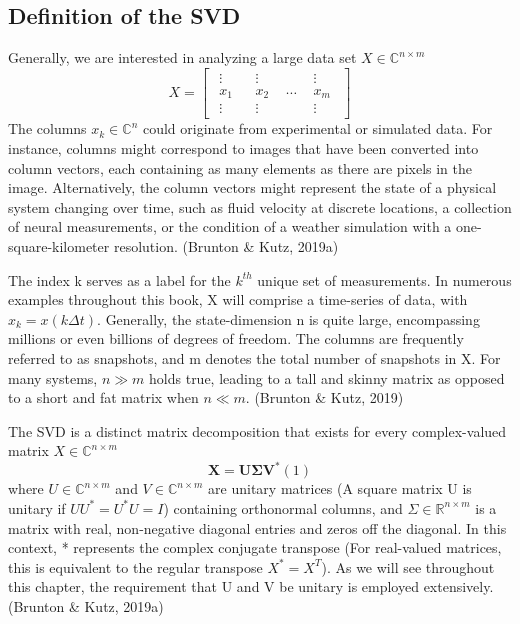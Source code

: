 \documentclass[a4paper]{article}
\begin{document}
{		\subsection{Definition of the SVD}
		Generally, we are interested in analyzing a large data set $X \in \mathbb{C}^{n \times m}$
		\[
		X =
		\begin{bmatrix}
			\begin{array}{c}
				\vdots \\
				x_1 \\
				\vdots
			\end{array}
			&
			\begin{array}{c}
				\vdots \\
				x_2 \\
				\vdots
			\end{array}
			&
			\cdots
			&
			\begin{array}{c}
				\vdots \\
				x_m \\
				\vdots
			\end{array}
		\end{bmatrix}
		\]
		The columns $x_k \in \mathbb{C}^n$ could originate from experimental or simulated data. For instance, columns might correspond to images that have been converted into column vectors, each containing as many elements as there are pixels in the image. Alternatively, the column vectors might represent the state of a physical system changing over time, such as fluid velocity at discrete locations, a collection of neural measurements, or the condition of a weather simulation with a one-square-kilometer resolution. (Brunton \& Kutz, 2019a)
		
		
		The index k serves as a label for the $k^{th}$ unique set of measurements. In numerous examples throughout this book, X will comprise a time-series of data, with $x_k = x(k\Delta t)$. Generally, the state-dimension n is quite large, encompassing millions or even billions of degrees of freedom. The columns are frequently referred to as snapshots, and m denotes the total number of snapshots in X. For many systems, $n \gg m$ holds true, leading to a tall and skinny matrix as opposed to a short and fat matrix when $n \ll m$. (Brunton \& Kutz, 2019)
		
		
		The SVD is a distinct matrix decomposition that exists for every complex-valued matrix $X \in \mathbb{C}^{n \times m}$
		\[
		\textbf{X} = \textbf{U} \boldsymbol{\Sigma} \textbf{V}^{*}          (1)
		\]
		where $U \in \mathbb{C}^{n \times m}$ and $V \in \mathbb{C}^{n \times m}$ are unitary matrices (A square matrix U is unitary if $UU^{*} = U^{*}U = I$) containing orthonormal columns, and $\Sigma \in \mathbb{R}^{n \times m}$ is a matrix with real, non-negative diagonal entries and zeros off the diagonal. In this context, * represents the complex conjugate transpose (For real-valued matrices, this is equivalent to the regular transpose $X^{*} = X^{T}$). As we will see throughout this chapter, the requirement that U and V be unitary is employed extensively. (Brunton \& Kutz, 2019a)
		
}
\end{document}
